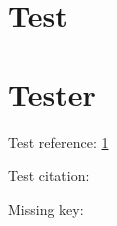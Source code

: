 \documentclass[a4paper,fleqn]{article}
\begin{document}
\tableofcontents

\section{Test}
\label{sec:test}

\section{Tester}
Test reference: \ref{sec:test}

Test citation: \cite{Wilf1990}

Missing key: \cite{r2d2}



\end{document}
